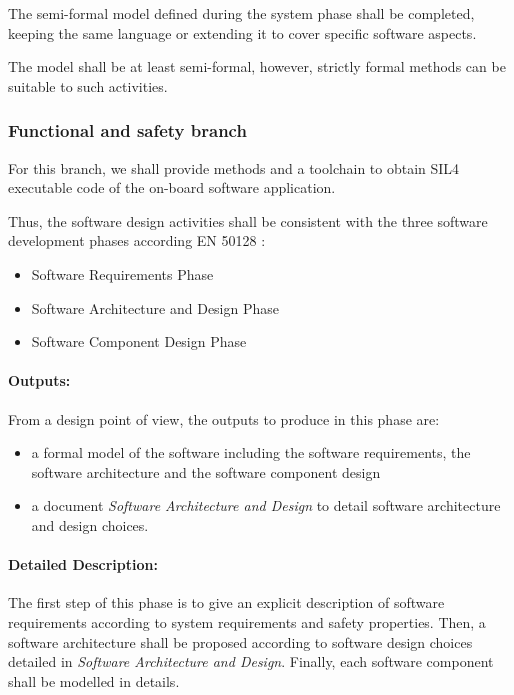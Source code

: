 The semi-formal model defined during the system phase shall be completed, keeping the same language or extending it to  cover specific software aspects.

The model  shall be at least semi-formal, however, strictly  formal  methods can be suitable to such activities.

\subsubsection{Functional and safety branch}

For this branch, we shall provide methods and a toolchain to  obtain SIL4 executable code of the on-board software application. 

Thus, the software design activities shall be consistent with the three software development phases according EN 50128 :

\begin{itemize}
\item Software Requirements Phase
\item Software Architecture and Design Phase
\item Software Component Design Phase
\end{itemize}

\paragraph{Outputs:}
\label{sec:sw-req-documents}
From a design point of view, the outputs to produce in this phase are:

\begin{itemize}
\item a formal model of the software including the software requirements, the software architecture and the software component design
\item  a document  \textit{Software Architecture and Design} to  detail software architecture and design choices.
\end{itemize}


\paragraph{Detailed Description:}
\label{sec:sw-req-deta-descr}

The first step of this phase is to give an explicit description of software requirements according to system requirements and safety properties.  Then, a software architecture shall be proposed according to software design choices detailed in  \textit{Software Architecture and Design}.
Finally, each software component shall be modelled in details.

